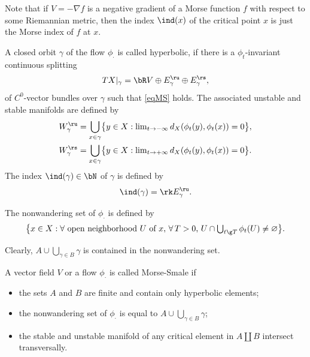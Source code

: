 Note that if $V=-\nabla f$ is a negative gradient of a Morse function
$f$
with respect to some Riemannian metric, then the index $\ind(x)$ of
the critical point $x$ is just the Morse index of $f$ at $x$.

\begin{defin}
A closed orbit $\gamma$ of the flow $\phi_{\cdot}$ is called hyperbolic,
if there is a $\phi_{t}$-invariant continuous splitting\vspace*{-3pt}
\begin{equation*}\label{eq:AF1}
TX|_{\gamma}=\bR V\oplus E^{\ru}_{\gamma}\oplus E^{\rs}_{\gamma},
\end{equation*}
of $C^{0}$-vector
bundles over $\gamma$ such that \eqref{eqMS} holds. The associated unstable and
stable manifolds are defined by
\begin{equation*}
\begin{aligned}
W^{\ru}_{\gamma}&=\bigcup_{x\in \gamma} \bigl\{y\in X: \textstyle\lim_{t\to
-\infty}d_{X}(\phi_{t}(y),\phi_{t}(x))=0 \bigr\},\\
W^{\rs}_{\gamma}&=\bigcup_{x\in \gamma} \bigl\{y\in X: \textstyle\lim_{t\to
+\infty}d_{X}(\phi_{t}(y),\phi_{t}(x))=0 \bigr\}.
\end{aligned}
\end{equation*}
The index $\ind(\gamma)\in \bN$ of $\gamma$ is defined by
\begin{equation}\label{indexg}
\ind(\gamma)=\rk E^{\ru}_{\gamma}.
\end{equation}
\end{defin}

\begin{defin}
The nonwandering set of $\phi_{\cdot}$ is defined by\vspace*{-3pt}
\begin{equation*}\textstyle
\bigl\{x\in X: \hbox{$\forall$ open neighborhood $U$ of $x$,
$\forall\, T>0$, } U\cap\bigcup_{t\g T} \phi_{t}(U)\neq
\varnothing \bigr\}.
\end{equation*}
\end{defin}
Clearly, $A\cup \bigcup_{\gamma\in B}\gamma$ is contained in the nonwandering set.

\begin{defin}
A vector field $V$ or a flow $\phi_{\cdot}$ is called Morse-Smale if
\begin{itemize}
\item the sets $A$ and $B$ are finite and contain only hyperbolic elements;
\item the nonwandering set of
$\phi_{\cdot}$ is equal to
$ A\cup \bigcup_{\gamma\in B}\gamma$;
\item the stable and unstable manifold of any critical
element in $A\coprod B$ intersect transversally.
\end{itemize}
\end{defin}

